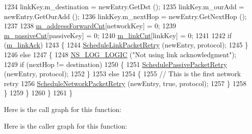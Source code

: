 \begin{DoxyCode}
1234           linkKey.m\_destination = newEntry.GetDst ();
1235           linkKey.m\_ourAdd = newEntry.GetOurAdd ();
1236           linkKey.m\_nextHop = newEntry.GetNextHop ();
1237 
1238           \hyperlink{classns3_1_1dsr_1_1DsrRouting_a5042f7e5df0470025fdb6023fcc24411}{m\_addressForwardCnt}[networkKey] = 0;
1239           \hyperlink{classns3_1_1dsr_1_1DsrRouting_a7fec404d680459aab2b40941a950502d}{m\_passiveCnt}[passiveKey] = 0;
1240           \hyperlink{classns3_1_1dsr_1_1DsrRouting_a85ba159639f9bc13b3d8890458128a79}{m\_linkCnt}[linkKey] = 0;
1241 
1242           \textcolor{keywordflow}{if} (\hyperlink{classns3_1_1dsr_1_1DsrRouting_a216a52d8b579a034df948765d941d3a4}{m\_linkAck})
1243             \{
1244               \hyperlink{classns3_1_1dsr_1_1DsrRouting_a947d831bc0964240b1a41b3a09832eff}{ScheduleLinkPacketRetry} (newEntry, protocol);
1245             \}
1246           \textcolor{keywordflow}{else}
1247             \{
1248               \hyperlink{group__logging_ga88acd260151caf2db9c0fc84997f45ce}{NS\_LOG\_LOGIC} (\textcolor{stringliteral}{"Not using link acknowledgment"});
1249               \textcolor{keywordflow}{if} (nextHop != destination)
1250                 \{
1251                   \hyperlink{classns3_1_1dsr_1_1DsrRouting_abfdfa37822a492971fdf24540b635039}{SchedulePassivePacketRetry} (newEntry, protocol);
1252                 \}
1253               \textcolor{keywordflow}{else}
1254                 \{
1255                   \textcolor{comment}{// This is the first network retry}
1256                   \hyperlink{classns3_1_1dsr_1_1DsrRouting_a6a18c6baa374d5e6a68f8952d1afdb13}{ScheduleNetworkPacketRetry} (newEntry, \textcolor{keyword}{true}, protocol);
1257                 \}
1258             \}
1259         \}
1260     \}
1261 \}
\end{DoxyCode}


Here is the call graph for this function\+:




Here is the caller graph for this function\+:


